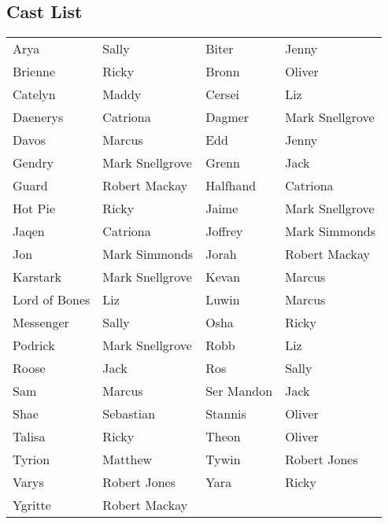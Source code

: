 \subsection*{Cast List}
\begin{tabular}{ll|ll}\\
Arya & Sally &  Biter & Jenny\\
Brienne & Ricky &  Bronn & Oliver\\
Catelyn & Maddy &  Cersei & Liz\\
Daenerys & Catriona &  Dagmer & Mark Snellgrove\\
Davos & Marcus &  Edd & Jenny\\
Gendry & Mark Snellgrove &  Grenn & Jack\\
Guard & Robert Mackay &  Halfhand & Catriona\\
Hot Pie & Ricky &  Jaime & Mark Snellgrove\\
Jaqen & Catriona &  Joffrey & Mark Simmonds\\
Jon & Mark Simmonds &  Jorah & Robert Mackay\\
Karstark & Mark Snellgrove &  Kevan & Marcus\\
Lord of Bones & Liz &  Luwin & Marcus\\
Messenger & Sally &  Osha & Ricky\\
Podrick & Mark Snellgrove &  Robb & Liz\\
Roose & Jack &  Ros & Sally\\
Sam & Marcus &  Ser Mandon & Jack\\
Shae & Sebastian &  Stannis & Oliver\\
Talisa & Ricky &  Theon & Oliver\\
Tyrion & Matthew &  Tywin & Robert Jones\\
Varys & Robert Jones &  Yara & Ricky\\
Ygritte & Robert Mackay &  \end{tabular}

